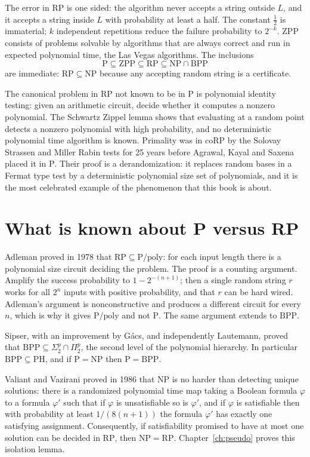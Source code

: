 \documentclass[11pt,twoside,openany]{book}
\theoremstyle{plain}
\theoremstyle{definition}
\theoremstyle{remark}
\newcommand{\RP}{\mathrm{RP}}
\newcommand{\coRP}{\mathrm{coRP}}
\newcommand{\BPP}{\mathrm{BPP}}
\newcommand{\ZPP}{\mathrm{ZPP}}
\newcommand{\NP}{\mathrm{NP}}
\newcommand{\Pc}{\mathrm{P}}
\newcommand{\PH}{\mathrm{PH}}
\newcommand{\Ppoly}{\mathrm{P}/\mathrm{poly}}
\begin{document}
The error in $\RP$ is one sided: the algorithm never accepts a string outside $L$, and it accepts a string inside $L$ with probability at least a half. The constant $\tfrac12$ is immaterial; $k$ independent repetitions reduce the failure probability to $2^{-k}$. $\ZPP$ consists of problems solvable by algorithms that are always correct and run in expected polynomial time, the Las Vegas algorithms. The inclusions
\[
\Pc \subseteq \ZPP \subseteq \RP \subseteq \NP \cap \BPP
\]
are immediate: $\RP \subseteq \NP$ because any accepting random string is a certificate.

The canonical problem in $\RP$ not known to be in $\Pc$ is polynomial identity testing: given an arithmetic circuit, decide whether it computes a nonzero polynomial. The Schwartz Zippel lemma shows that evaluating at a random point detects a nonzero polynomial with high probability, and no deterministic polynomial time algorithm is known. Primality was in $\coRP$ by the Solovay Strassen and Miller Rabin tests for 25 years before Agrawal, Kayal and Saxena placed it in $\Pc$. Their proof is a derandomization: it replaces random bases in a Fermat type test by a deterministic polynomial size set of polynomials, and it is the most celebrated example of the phenomenon that this book is about.

\section{What is known about P versus RP}

Adleman proved in 1978 that $\RP \subseteq \Ppoly$: for each input length there is a polynomial size circuit deciding the problem. The proof is a counting argument. Amplify the success probability to $1 - 2^{-(n+1)}$; then a single random string $r$ works for all $2^n$ inputs with positive probability, and that $r$ can be hard wired. Adleman's argument is nonconstructive and produces a different circuit for every $n$, which is why it gives $\Ppoly$ and not $\Pc$. The same argument extends to $\BPP$.

Sipser, with an improvement by G\'acs, and independently Lautemann, proved that $\BPP \subseteq \Sigma_2^p \cap \Pi_2^p$, the second level of the polynomial hierarchy. In particular $\BPP \subseteq \PH$, and if $\Pc = \NP$ then $\Pc = \BPP$.

Valiant and Vazirani \cite{ValiantVazirani} proved in 1986 that $\NP$ is no harder than detecting unique solutions: there is a randomized polynomial time map taking a Boolean formula $\varphi$ to a formula $\varphi'$ such that if $\varphi$ is unsatisfiable so is $\varphi'$, and if $\varphi$ is satisfiable then with probability at least $1/(8(n+1))$ the formula $\varphi'$ has exactly one satisfying assignment. Consequently, if satisfiability promised to have at most one solution can be decided in $\RP$, then $\NP = \RP$. Chapter~\ref{ch:pseudo} proves this isolation lemma.
\end{document}
